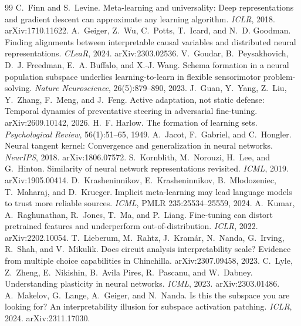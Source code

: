 \documentclass[11pt]{article}
\begin{document}
\begin{thebibliography}{99}
 C.~Finn and S.~Levine. Meta-learning and universality: Deep representations and gradient descent can approximate any learning algorithm. \emph{ICLR}, 2018. arXiv:1710.11622.
 A.~Geiger, Z.~Wu, C.~Potts, T.~Icard, and N.~D. Goodman. Finding alignments between interpretable causal variables and distributed neural representations. \emph{CLeaR}, 2024. arXiv:2303.02536.
 V.~Goudar, B.~Peysakhovich, D.~J. Freedman, E.~A. Buffalo, and X.-J. Wang. Schema formation in a neural population subspace underlies learning-to-learn in flexible sensorimotor problem-solving. \emph{Nature Neuroscience}, 26(5):879--890, 2023.
 J.~Guan, Y.~Yang, Z.~Liu, Y.~Zhang, F.~Meng, and J.~Feng. Active adaptation, not static defense: Temporal dynamics of preventative steering in adversarial fine-tuning. arXiv:2609.10142, 2026.
 H.~F. Harlow. The formation of learning sets. \emph{Psychological Review}, 56(1):51--65, 1949.
 A.~Jacot, F.~Gabriel, and C.~Hongler. Neural tangent kernel: Convergence and generalization in neural networks. \emph{NeurIPS}, 2018. arXiv:1806.07572.
 S.~Kornblith, M.~Norouzi, H.~Lee, and G.~Hinton. Similarity of neural network representations revisited. \emph{ICML}, 2019. arXiv:1905.00414.
 D.~Krasheninnikov, E.~Krasheninnikov, B.~Mlodozeniec, T.~Maharaj, and D.~Krueger. Implicit meta-learning may lead language models to trust more reliable sources. \emph{ICML}, PMLR 235:25534--25559, 2024.
 A.~Kumar, A.~Raghunathan, R.~Jones, T.~Ma, and P.~Liang. Fine-tuning can distort pretrained features and underperform out-of-distribution. \emph{ICLR}, 2022. arXiv:2202.10054.
 T.~Lieberum, M.~Rahtz, J.~Kram\'ar, N.~Nanda, G.~Irving, R.~Shah, and V.~Mikulik. Does circuit analysis interpretability scale? Evidence from multiple choice capabilities in Chinchilla. arXiv:2307.09458, 2023.
 C.~Lyle, Z.~Zheng, E.~Nikishin, B.~Avila Pires, R.~Pascanu, and W.~Dabney. Understanding plasticity in neural networks. \emph{ICML}, 2023. arXiv:2303.01486.
 A.~Makelov, G.~Lange, A.~Geiger, and N.~Nanda. Is this the subspace you are looking for? An interpretability illusion for subspace activation patching. \emph{ICLR}, 2024. arXiv:2311.17030.

\end{thebibliography}
\end{document}
